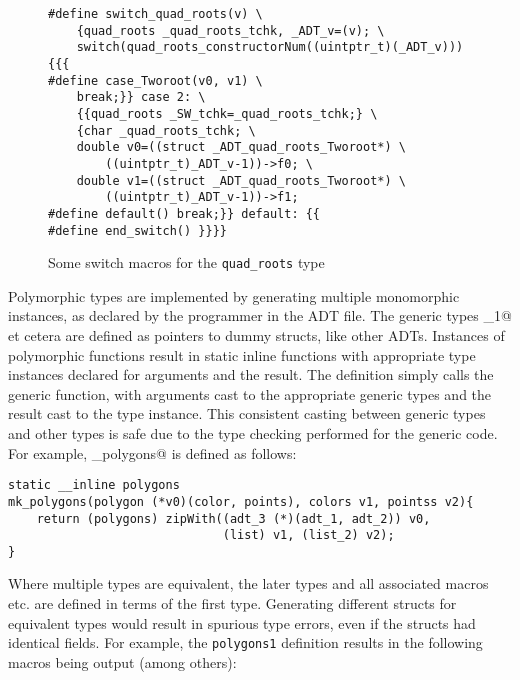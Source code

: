 
\begin{figure}
\begin{verbatim}
#define switch_quad_roots(v) \
    {quad_roots _quad_roots_tchk, _ADT_v=(v); \
    switch(quad_roots_constructorNum((uintptr_t)(_ADT_v))){{{
#define case_Tworoot(v0, v1) \
    break;}} case 2: \
    {{quad_roots _SW_tchk=_quad_roots_tchk;} \
    {char _quad_roots_tchk; \
    double v0=((struct _ADT_quad_roots_Tworoot*) \
        ((uintptr_t)_ADT_v-1))->f0; \
    double v1=((struct _ADT_quad_roots_Tworoot*) \
        ((uintptr_t)_ADT_v-1))->f1;
#define default() break;}} default: {{
#define end_switch() }}}}
\end{verbatim}
\caption{Some switch macros for the \texttt{quad\_roots} type}
\label{fig:swmacros}
\end{figure}


Polymorphic types are implemented by generating multiple monomorphic
instances, as declared by the programmer in the ADT file.  The generic
types \verb@adt_1@ et cetera are defined as pointers to dummy structs,
like other ADTs.  Instances of polymorphic functions result in static
inline functions with appropriate type instances declared for  arguments
and the result.  The definition simply calls the generic function, with
arguments cast to the appropriate generic types and the result cast to
the type instance.  This consistent casting between generic types and other
types is safe due to the type checking performed for the generic code.
For example, \verb@mk_polygons@ is defined as follows:


\begin{verbatim}
static __inline polygons
mk_polygons(polygon (*v0)(color, points), colors v1, pointss v2){
    return (polygons) zipWith((adt_3 (*)(adt_1, adt_2)) v0,
                              (list) v1, (list_2) v2);
}
\end{verbatim}


Where multiple types are equivalent, the later types and all associated
macros etc. are defined in terms of the first type.  Generating different
structs for equivalent types would result in spurious type errors,
even if the structs had identical fields. For example,
the \texttt{polygons1} definition results in the following macros being
output (among others):

